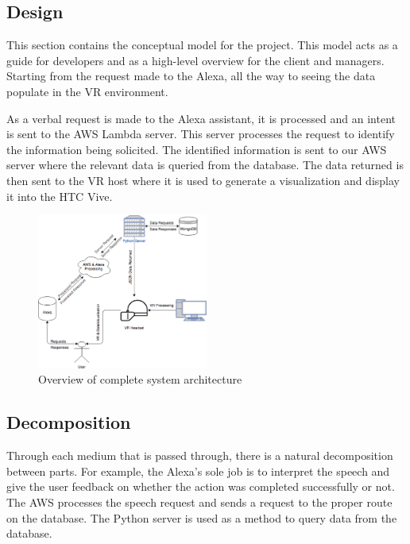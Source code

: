 \documentclass[onecolumn, draftclsnofoot,10pt, compsoc]{IEEEtran}
\begin{document}
    \subsection{Design}
        This section contains the conceptual model for the project. This model acts as a guide for developers and as a high-level overview for the client and managers. Starting from the request made to the Alexa, all the way to seeing the data populate in the VR environment. 
        
        As a verbal request is made to the Alexa assistant, it is processed and an intent is sent to the AWS Lambda server. This server processes the request to identify the information being solicited. The identified information is sent to our AWS server where the relevant data is queried from the database. The data returned is then sent to the VR host where it is used to generate a visualization and display it into the HTC Vive.
        
        \begin{figure}
            \centering
            \includegraphics[width=0.5\textwidth]{Design_flow_chart.eps}
            \caption{Overview of complete system architecture}
            \label{fig:design flow chart}
        \end{figure}

    \subsection{Decomposition}
        Through each medium that is passed through, there is a natural decomposition between parts. For example, the Alexa{'}s sole job is to interpret the speech and give the user feedback on whether the action was completed successfully or not. The AWS processes the speech request and sends a request to the proper route on the database. The Python server is used as a method to query data from the database.
        
\end{document}
